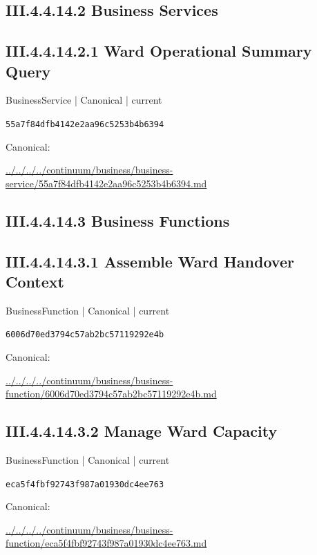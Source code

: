 \documentclass[10pt,a4paper]{article}
\begin{document}
\subsection*{III.4.4.14.2 Business Services}
\subsection*{III.4.4.14.2.1 Ward Operational Summary Query}
\label{element-55a7f84dfb4142e2aa96c5253b4b6394}
{\small BusinessService | Canonical | current}\par
\texttt{55a7f84dfb4142e2aa96c5253b4b6394}\par
Canonical: \par
{\footnotesize\url{../../../../continuum/business/business-service/55a7f84dfb4142e2aa96c5253b4b6394.md}}\par
\subsection*{III.4.4.14.3 Business Functions}
\subsection*{III.4.4.14.3.1 Assemble Ward Handover Context}
\label{element-6006d70ed3794c57ab2bc57119292e4b}
{\small BusinessFunction | Canonical | current}\par
\texttt{6006d70ed3794c57ab2bc57119292e4b}\par
Canonical: \par
{\footnotesize\url{../../../../continuum/business/business-function/6006d70ed3794c57ab2bc57119292e4b.md}}\par
\subsection*{III.4.4.14.3.2 Manage Ward Capacity}
\label{element-eca5f4fbf92743f987a01930dc4ee763}
{\small BusinessFunction | Canonical | current}\par
\texttt{eca5f4fbf92743f987a01930dc4ee763}\par
Canonical: \par
{\footnotesize\url{../../../../continuum/business/business-function/eca5f4fbf92743f987a01930dc4ee763.md}}\par
\end{document}
